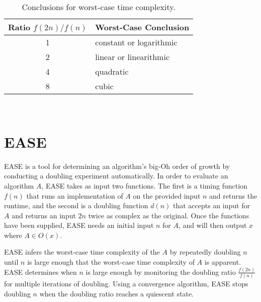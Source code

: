\documentclass[10pt,twocolumn]{article}
\newcommand{\toolname}{{\sc EASE}\xspace}
\begin{document}
\begin{table}[h!]
  \vspace*{-.15in}
  \begin{center}
    \begin{tabular}{c|l}
      Ratio $f(2n)/f(n)$ & Worst-Case Conclusion              \\ \hline
      1                  & constant or logarithmic \\
      2                  & linear or linearithmic  \\
      4                  & quadratic               \\
      8                  & cubic                   \\
    \end{tabular}
  \end{center}
  \vspace*{-.25in}

  \caption{Conclusions for worst-case time complexity.}~\label{table:ratios}
  \vspace*{-.35in}

\end{table}

\section{\toolname}
    \toolname \cite{kinneer2015,tool} is a tool for
    determining an algorithm's big-Oh order of growth by
    conducting a doubling experiment automatically.  In order to
    evaluate an algorithm $A$, \toolname takes as input two
    functions. The first is a timing function $f(n)$ that runs an
    implementation of $A$ on the provided input $n$ and returns
    the runtime, and the second is a doubling function $d(n)$ that
    accepts an input for $A$ and returns an input $2n$ twice as
    complex as the original. Once the functions have been supplied,
    \toolname needs an initial input $n$ for $A$, and will then 
    output $x$ where $A \in O(x)$.

    \toolname infers the worst-case time complexity of the $A$ by
    repeatedly doubling $n$ until $n$ is large enough that the
    worst-case time complexity of $A$ is apparent.  \toolname
    determines when $n$ is large enough by monitoring the doubling
    ratio $\frac{f(2n)}{f(n)}$ for multiple iterations of doubling.
    Using a convergence algorithm, \toolname stops doubling $n$
    when the doubling ratio reaches a quiescent state.
   
\end{document}
